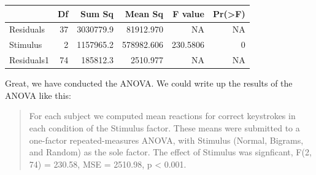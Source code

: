 \documentclass[]{book}
\newenvironment{Shaded}{\begin{snugshade}}{\end{snugshade}}
\newcommand{\KeywordTok}[1]{\textcolor[rgb]{0.13,0.29,0.53}{\textbf{{#1}}}}
\newcommand{\DataTypeTok}[1]{\textcolor[rgb]{0.13,0.29,0.53}{{#1}}}
\newcommand{\DecValTok}[1]{\textcolor[rgb]{0.00,0.00,0.81}{{#1}}}
\newcommand{\StringTok}[1]{\textcolor[rgb]{0.31,0.60,0.02}{{#1}}}
\newcommand{\CommentTok}[1]{\textcolor[rgb]{0.56,0.35,0.01}{\textit{{#1}}}}
\newcommand{\NormalTok}[1]{{#1}}
\theoremstyle{definition}
\theoremstyle{definition}
\theoremstyle{definition}
\theoremstyle{remark}
\begin{document}
\begin{Shaded}
\end{Shaded}

\begin{tabular}{l|r|r|r|r|r}
\hline
  & Df & Sum Sq & Mean Sq & F value & Pr(>F)\\
\hline
Residuals & 37 & 3030779.9 & 81912.970 & NA & NA\\
\hline
Stimulus & 2 & 1157965.2 & 578982.606 & 230.5806 & 0\\
\hline
Residuals1 & 74 & 185812.3 & 2510.977 & NA & NA\\
\hline
\end{tabular}

Great, we have conducted the ANOVA. We could write up the results of the
ANOVA like this:

\begin{quote}
For each subject we computed mean reactions for correct keystrokes in
each condition of the Stimulus factor. These means were submitted to a
one-factor repeated-measures ANOVA, with Stimulus (Normal, Bigrams, and
Random) as the sole factor. The effect of Stimulus was signficant, F(2,
74) = 230.58, MSE = 2510.98, p \textless{} 0.001.
\end{quote}
\end{document}
